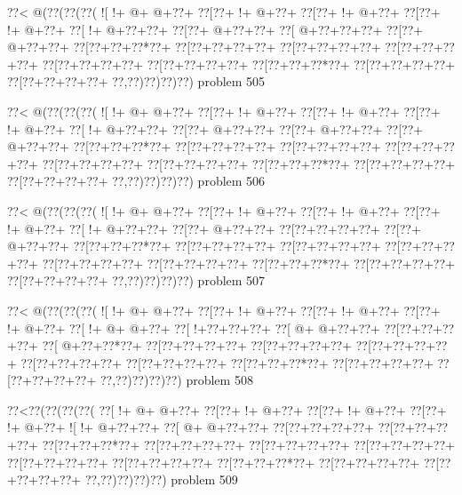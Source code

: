 \vbox{\vbox{\goo
\0??<\- @(\0??(\0??(\0??(
\- ![\- !+\- @+\- @+\0??+
\0??[\0??+\- !+\- @+\0??+
\0??[\0??+\- !+\- @+\0??+
\0??[\0??+\- !+\- @+\0??+
\0??[\- !+\- @+\0??+\0??+
\0??[\0??+\- @+\0??+\0??+
\0??[\- @+\0??+\0??+\0??+
\0??[\0??+\- @+\0??+\0??+
\0??[\0??+\0??+\0??*\0??+
\0??[\0??+\0??+\0??+\0??+
\0??[\0??+\0??+\0??+\0??+
\0??[\0??+\0??+\0??+\0??+
\0??[\0??+\0??+\0??+\0??+
\0??[\0??+\0??+\0??+\0??+
\0??[\0??+\0??+\0??*\0??+
\0??[\0??+\0??+\0??+\0??+
\0??[\0??+\0??+\0??+\0??+
\0??,\0??)\0??)\0??)\0??)
}
\hfil problem 505\hfil\break
}

\vbox{\vbox{\goo
\0??<\- @(\0??(\0??(\0??(
\- ![\- !+\- @+\- @+\0??+
\0??[\0??+\- !+\- @+\0??+
\0??[\0??+\- !+\- @+\0??+
\0??[\0??+\- !+\- @+\0??+
\0??[\- !+\- @+\0??+\0??+
\0??[\0??+\- @+\0??+\0??+
\0??[\0??+\- @+\0??+\0??+
\0??[\0??+\- @+\0??+\0??+
\0??[\0??+\0??+\0??*\0??+
\0??[\0??+\0??+\0??+\0??+
\0??[\0??+\0??+\0??+\0??+
\0??[\0??+\0??+\0??+\0??+
\0??[\0??+\0??+\0??+\0??+
\0??[\0??+\0??+\0??+\0??+
\0??[\0??+\0??+\0??*\0??+
\0??[\0??+\0??+\0??+\0??+
\0??[\0??+\0??+\0??+\0??+
\0??,\0??)\0??)\0??)\0??)
}
\hfil problem 506\hfil\break
}

\vbox{\vbox{\goo
\0??<\- @(\0??(\0??(\0??(
\- ![\- !+\- @+\- @+\0??+
\0??[\0??+\- !+\- @+\0??+
\0??[\0??+\- !+\- @+\0??+
\0??[\0??+\- !+\- @+\0??+
\0??[\- !+\- @+\0??+\0??+
\0??[\0??+\- @+\0??+\0??+
\0??[\0??+\0??+\0??+\0??+
\0??[\0??+\- @+\0??+\0??+
\0??[\0??+\0??+\0??*\0??+
\0??[\0??+\0??+\0??+\0??+
\0??[\0??+\0??+\0??+\0??+
\0??[\0??+\0??+\0??+\0??+
\0??[\0??+\0??+\0??+\0??+
\0??[\0??+\0??+\0??+\0??+
\0??[\0??+\0??+\0??*\0??+
\0??[\0??+\0??+\0??+\0??+
\0??[\0??+\0??+\0??+\0??+
\0??,\0??)\0??)\0??)\0??)
}
\hfil problem 507\hfil\break
}

\vbox{\vbox{\goo
\0??<\- @(\0??(\0??(\0??(
\- ![\- !+\- @+\- @+\0??+
\0??[\0??+\- !+\- @+\0??+
\0??[\0??+\- !+\- @+\0??+
\0??[\0??+\- !+\- @+\0??+
\0??[\- !+\- @+\- @+\0??+
\0??[\- !+\0??+\0??+\0??+
\0??[\- @+\- @+\0??+\0??+
\0??[\0??+\0??+\0??+\0??+
\0??[\- @+\0??+\0??*\0??+
\0??[\0??+\0??+\0??+\0??+
\0??[\0??+\0??+\0??+\0??+
\0??[\0??+\0??+\0??+\0??+
\0??[\0??+\0??+\0??+\0??+
\0??[\0??+\0??+\0??+\0??+
\0??[\0??+\0??+\0??*\0??+
\0??[\0??+\0??+\0??+\0??+
\0??[\0??+\0??+\0??+\0??+
\0??,\0??)\0??)\0??)\0??)
}
\hfil problem 508\hfil\break
}

\vbox{\vbox{\goo
\0??<\0??(\0??(\0??(\0??(
\0??[\- !+\- @+\- @+\0??+
\0??[\0??+\- !+\- @+\0??+
\0??[\0??+\- !+\- @+\0??+
\0??[\0??+\- !+\- @+\0??+
\- ![\- !+\- @+\0??+\0??+
\0??[\- @+\- @+\0??+\0??+
\0??[\0??+\0??+\0??+\0??+
\0??[\0??+\0??+\0??+\0??+
\0??[\0??+\0??+\0??*\0??+
\0??[\0??+\0??+\0??+\0??+
\0??[\0??+\0??+\0??+\0??+
\0??[\0??+\0??+\0??+\0??+
\0??[\0??+\0??+\0??+\0??+
\0??[\0??+\0??+\0??+\0??+
\0??[\0??+\0??+\0??*\0??+
\0??[\0??+\0??+\0??+\0??+
\0??[\0??+\0??+\0??+\0??+
\0??,\0??)\0??)\0??)\0??)
}
\hfil problem 509\hfil\break
}

